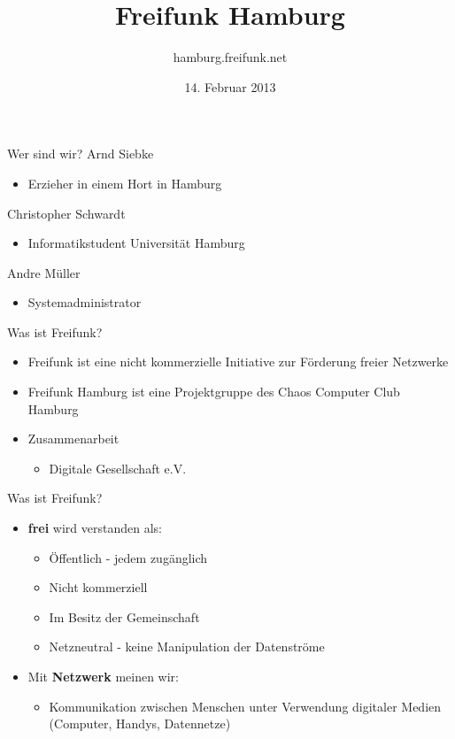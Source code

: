 \documentclass[c]{beamer}
\title{Freifunk Hamburg}
\author{hamburg.freifunk.net}
\date{14. Februar 2013}
\begin{document}
\maketitle

\begin{frame}{Wer sind wir?}
	Arnd Siebke
	\begin{itemize}
		\item Erzieher in einem Hort in Hamburg
	\end{itemize}

	Christopher Schwardt
	\begin{itemize}
		\item Informatikstudent Universität Hamburg
	\end{itemize}

	Andre Müller
	\begin{itemize}
		\item Systemadministrator
	\end{itemize}
\end{frame}


\begin{frame}{Was ist Freifunk?}
	\begin{itemize}
		\item Freifunk ist eine nicht kommerzielle Initiative zur Förderung freier Netzwerke

		\item Freifunk Hamburg ist eine Projektgruppe des Chaos Computer Club Hamburg

		\item Zusammenarbeit
		\begin{itemize}
			\item Digitale Gesellschaft e.V.
		\end{itemize}
	\end{itemize}
\end{frame}

\begin{frame}{Was ist Freifunk?}
\begin{itemize}
	\item \textbf{frei} wird verstanden als:
	\begin{itemize}
		\item Öffentlich - jedem zugänglich
		\item Nicht kommerziell
		\item Im Besitz der Gemeinschaft
		\item Netzneutral - keine Manipulation der Datenströme
	\end{itemize}
	\item Mit \textbf{Netzwerk} meinen wir:
	\begin{itemize}
		\item Kommunikation zwischen Menschen unter Verwendung digitaler Medien (Computer, Handys, Datennetze)
	\end{itemize}
  \end{itemize}
\end{frame}
\end{document}
